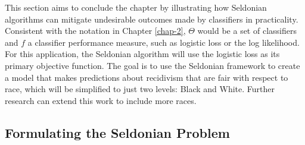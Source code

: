 \documentclass[12pt, twoside]{amherstthesis}
\begin{document}
This section aims to conclude the chapter by illustrating how Seldonian algorithms can mitigate undesirable outcomes made by classifiers in practicality. Consistent with the notation in Chapter \ref{chap-2}, \(\Theta\) would be a set of classifiers and \(f\) a classifier performance measure, such as logistic loss or the log likelihood. For this application, the Seldonian algorithm will use the logistic loss as its primary objective function. The goal is to use the Seldonian framework to create a model that makes predictions about recidivism that are fair with respect to race, which will be simplified to just two levels: Black and White. Further research can extend this work to include more races.

\hypertarget{formulating-the-seldonian-problem}{%
\subsection{Formulating the Seldonian Problem}\label{formulating-the-seldonian-problem}}
\end{document}
